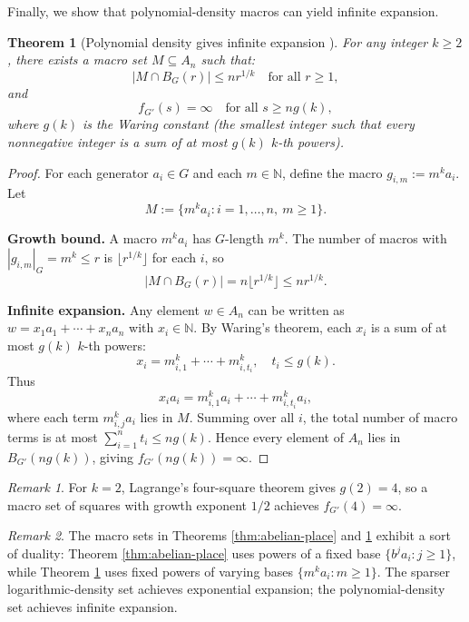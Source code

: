 \documentclass[12pt]{amsart}
\newcommand{\N}{\mathbb{N}}
\newtheorem{theorem}{Theorem}
\theoremstyle{definition}
\theoremstyle{remark}
\newtheorem{remark}{Remark}
\begin{document}
Finally, we show that polynomial-density macros can yield infinite expansion.

\begin{theorem}[Polynomial density gives infinite expansion ]\label{thm:abelian-waring}
For any integer $k \geq 2$, there exists a macro set $M \subseteq A_n$ such that:
\[
|M \cap B_G(r)| \leq n r^{1/k} \quad \text{for all } r \geq 1,
\]
and
\[
f_{G'}(s) = \infty \quad \text{for all } s \geq ng(k),
\]
where $g(k)$ is the Waring constant (the smallest integer such that every nonnegative integer is a sum of at most $g(k)$ $k$-th powers).
\end{theorem}

\begin{proof}
For each generator $a_i \in G$ and each $m \in \N$, define the macro $g_{i,m} := m^k a_i$. Let
\[
M := \{ m^k a_i : i = 1, \ldots, n, \ m \geq 1 \}.
\]

\textbf{Growth bound.} A macro $m^k a_i$ has $G$-length $m^k$. The number of macros with $|g_{i,m}|_G = m^k \leq r$ is $\lfloor r^{1/k} \rfloor$ for each $i$, so
\[
|M \cap B_G(r)| = n \lfloor r^{1/k} \rfloor \leq n r^{1/k}.
\]

\textbf{Infinite expansion.} Any element $w \in A_n$ can be written as $w = x_1 a_1 + \cdots + x_n a_n$ with $x_i \in \N$. By Waring's theorem, each $x_i$ is a sum of at most $g(k)$ $k$-th powers:
\[
x_i = m_{i,1}^k + \cdots + m_{i,t_i}^k, \quad t_i \leq g(k).
\]
Thus
\[
x_i a_i = m_{i,1}^k a_i + \cdots + m_{i,t_i}^k a_i,
\]
where each term $m_{i,j}^k a_i$ lies in $M$. Summing over all $i$, the total number of macro terms is at most $\sum_{i=1}^n t_i \leq ng(k)$. Hence every element of $A_n$ lies in $B_{G'}(ng(k))$, giving $f_{G'}(ng(k)) = \infty$.
\end{proof}

\begin{remark}
For $k = 2$, Lagrange's four-square theorem gives $g(2) = 4$, so a macro set of squares with growth exponent $1/2$ achieves $f_{G'}(4) = \infty$.
\end{remark}

\begin{remark}
The macro sets in Theorems \ref{thm:abelian-place} and \ref{thm:abelian-waring} exhibit a sort of duality: 
Theorem \ref{thm:abelian-place} uses powers of a fixed base $\{b^j a_i : j \geq 1\}$, while Theorem \ref{thm:abelian-waring} uses fixed powers of varying bases $\{m^k a_i : m \geq 1\}$.
The sparser logarithmic-density set achieves exponential expansion; the polynomial-density set achieves infinite expansion. 
\end{remark}
\end{document}

